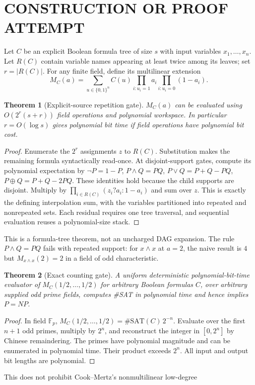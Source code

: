 \documentclass[11pt]{article}
\newtheorem{theorem}{Theorem}
\begin{document}
\section{CONSTRUCTION OR PROOF ATTEMPT}
Let $C$ be an explicit Boolean formula tree of size $s$ with input
variables $x_1,\ldots,x_n$. Let $R(C)$ contain variable names
appearing at least twice among its leaves; set $r=|R(C)|$.
For any finite field, define its multilinear extension
\[
 M_C(a)=\sum_{u\in\{0,1\}^n}C(u)
 \prod_{i:u_i=1}a_i\prod_{i:u_i=0}(1-a_i).
\]
\begin{theorem}[Explicit-source repetition gate]
$M_C(a)$ can be evaluated using $O(2^r(s+r))$ field operations
and polynomial workspace. In particular $r=O(\log s)$ gives
polynomial bit time if field operations have polynomial bit cost.
\end{theorem}
\begin{proof}
Enumerate the $2^r$ assignments $z$ to $R(C)$. Substitution makes
the remaining formula syntactically read-once. At disjoint-support
gates, compute its polynomial expectation by
$\neg P=1-P$, $P\wedge Q=PQ$, $P\vee Q=P+Q-PQ$,
$P\oplus Q=P+Q-2PQ$. These identities hold because the child
supports are disjoint. Multiply by
$\prod_{i\in R(C)}(z_i?a_i:1-a_i)$ and sum over $z$.
This is exactly the defining interpolation sum, with the
variables partitioned into repeated and nonrepeated sets.
Each residual requires one tree traversal, and sequential
evaluation reuses a polynomial-size stack. \end{proof}
This is a formula-tree theorem, not an uncharged DAG expansion.
The rule $P\wedge Q=PQ$ fails with repeated support: for
$x\wedge x$ at $a=2$, the naive result is $4$ but
$M_{x\wedge x}(2)=2$ in a field of odd characteristic.
\begin{theorem}[Exact counting gate]
A uniform deterministic polynomial-bit-time evaluator of
$M_C(1/2,\ldots,1/2)$ for arbitrary Boolean formulas $C$,
over arbitrary supplied odd prime fields, computes \#SAT in
polynomial time and hence implies $P=NP$.
\end{theorem}
\begin{proof}
In field $\mathbb F_p$,
$M_C(1/2,\ldots,1/2)=\#\mathrm{SAT}(C)\,2^{-n}$.
Evaluate over the first $n+1$ odd primes, multiply by $2^n$,
and reconstruct the integer in $[0,2^n]$ by Chinese remaindering.
The primes have polynomial magnitude and can be enumerated
in polynomial time. Their product exceeds $2^n$.
All input and output bit lengths are polynomial. \end{proof}
This does not prohibit Cook--Mertz's nonmultilinear low-degree
\end{document}
